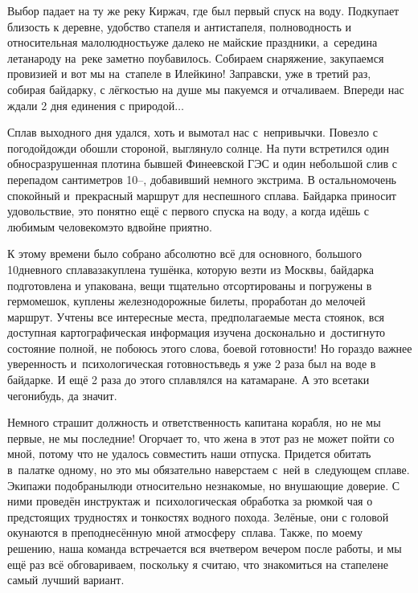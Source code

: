 \newpage
Выбор падает на ту же реку Киржач, где был первый спуск на воду. Подкупает близость к деревне, удобство стапеля и антистапеля, полноводность и относительная малолюдность\mdash уже далеко не майские праздники, а~середина лета\mdash народу на~реке заметно поубавилось. Собираем снаряжение, закупаемся провизией и вот мы на~стапеле в Илейкино! Заправски, уже в третий раз, собирая байдарку, с лёгкостью на душе мы пакуемся и отчаливаем. Впереди нас ждали 2 дня единения с природой$\ldots$

Сплав выходного дня удался, хоть и вымотал нас с~непривычки. Повезло с погодой\mdash дожди обошли стороной, выглянуло солнце. На пути встретился один обнос\mdash разрушенная плотина бывшей Финеевской ГЭС и один небольшой слив с перепадом сантиметров 10\thinspace\nobreakdash--, добавивший немного экстрима. В остальном\mdash очень спокойный и~прекрасный маршрут для неспешного сплава. Байдарка приносит удовольствие, это понятно ещё с первого спуска на воду, а когда идёшь с любимым человеком\mdash это вдвойне приятно.

К этому времени было собрано абсолютно всё для основного, большого 10\sdash дневного сплава\mdash закуплена тушёнка, которую везти из Москвы, байдарка подготовлена и упакована, вещи тщательно отсортированы и погружены в гермомешок, куплены железнодорожные билеты, проработан до мелочей маршрут. Учтены все интересные места, предполагаемые места стоянок, вся доступная картографическая информация изучена досконально и~достигнуто состояние полной, не побоюсь этого слова, боевой готовности! Но гораздо  важнее уверенность и~психологическая готовность\mdash ведь я уже 2 раза был на воде в байдарке. И ещё 2 раза до этого сплавлялся на катамаране. А это все\sdash таки чего\sdash нибудь, да значит.

Немного страшит должность и ответственность капитана корабля, но не мы первые, не мы последние! Огорчает то, что жена в этот раз не может пойти со мной, потому что не удалось совместить наши отпуска. Придется обитать в~палатке одному, но это мы обязательно наверстаем с~ней в~следующем сплаве.
Экипажи подобраны\mdash люди относительно незнакомые, но внушающие доверие. С ними проведён инструктаж и~психологическая обработка за рюмкой чая о предстоящих трудностях и тонкостях водного похода. Зелёные, они с головой окунаются в преподнесённую мной атмосферу~сплава. Также, по моему решению, наша команда встречается вся вчетвером вечером после работы, и мы ещё раз всё обговариваем, поскольку я считаю, что знакомиться на стапеле\mdash не самый лучший вариант.

